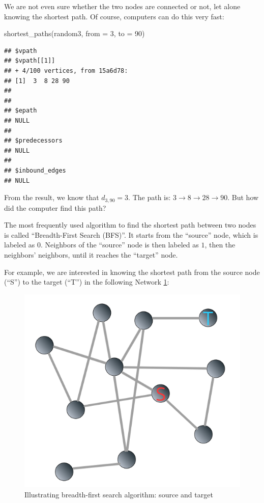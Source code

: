 \documentclass[
]{krantz}
\makeatletter
\newenvironment{Shaded}{\begin{snugshade}}{\end{snugshade}}
\newcommand{\AttributeTok}[1]{\textcolor[rgb]{0.61,0.61,0.61}{#1}}
\newcommand{\DecValTok}[1]{\textcolor[rgb]{0.06,0.06,0.06}{#1}}
\newcommand{\FunctionTok}[1]{\textcolor[rgb]{0,0,0}{#1}}
\newcommand{\NormalTok}[1]{#1}
\newenvironment{kframe}{%
\medskip{}
\setlength{\fboxsep}{.8em}
 \def\at@end@of@kframe{}%
 \ifinner\ifhmode%
  \def\at@end@of@kframe{\end{minipage}}%
  \begin{minipage}{\columnwidth}%
 \fi\fi%
 \def\FrameCommand##1{\hskip\@totalleftmargin \hskip-\fboxsep
 \colorbox{shadecolor}{##1}\hskip-\fboxsep
     \hskip-\linewidth \hskip-\@totalleftmargin \hskip\columnwidth}%
 \MakeFramed {\advance\hsize-\width
   \@totalleftmargin\z@ \linewidth\hsize
   \@setminipage}}%
 {\par\unskip\endMakeFramed%
 \at@end@of@kframe}
\renewenvironment{Shaded}{\begin{kframe}}{\end{kframe}}
\makeatother
\begin{document}
We are not even sure whether the two nodes are connected or not, let alone knowing the shortest path. Of course, computers can do this very fast:

\begin{Shaded}
\begin{Highlighting}[]
\FunctionTok{shortest\_paths}\NormalTok{(random3, }\AttributeTok{from =} \DecValTok{3}\NormalTok{, }\AttributeTok{to =} \DecValTok{90}\NormalTok{)}
\end{Highlighting}
\end{Shaded}

\begin{verbatim}
## $vpath
## $vpath[[1]]
## + 4/100 vertices, from 15a6d78:
## [1]  3  8 28 90
## 
## 
## $epath
## NULL
## 
## $predecessors
## NULL
## 
## $inbound_edges
## NULL
\end{verbatim}

From the result, we know that \(d_{3, 90} = 3\). The path is: \(3 \to 8 \to 28 \to 90\). But how did the computer find this path?

The most frequently used algorithm to find the shortest path between two nodes is called ``Breadth-First Search (BFS)''. It starts from the ``source'' node, which is labeled as \(0\). Neighbors of the ``source'' node is then labeled as \(1\), then the neighbors' neighbors, until it reaches the ``target'' node.

For example, we are interested in knowing the shortest path from the source node (``S'') to the target (``T'') in the following Network \ref{fig:bfs01}:

\begin{figure}

{\centering \includegraphics[width=0.55\linewidth]{images/bfs01} 

}

\caption{Illustrating breadth-first search algorithm: source and target}\label{fig:bfs01}
\end{figure}
\end{document}
